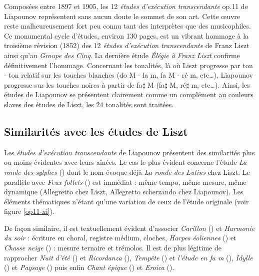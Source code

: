Composées entre 1897 et 1905, les 12 \emph{études d'exécution transcendante} op.11 de Liapounov représentent sans aucun doute le sommet de son art. Cette œuvre reste malheureusement fort peu connu tant des interprètes que des musicophiles. Ce monumental cycle d'études, environ 130 pages, est un vibrant hommage à la troisième révision (1852) des 12 \emph{études d'exécution transcendante} de Franz Liszt ainsi qu'au \emph{Groupe des Cinq}. La dernière étude \emph{Élégie à Franz Liszt} confirme définitivement l'hommage. Concernant les tonalités, là où Liszt progresse par ton - ton relatif sur les touches blanches (do M - la m, fa M - ré m, etc\dots), Liapounov progresse sur les touches noires à partir de fa$\sharp$ M (fa$\sharp$ M, ré$\sharp$ m, etc\dots). Ainsi, les études de Liapounov se présentent clairement comme un complément au couleurs slaves des études de Liszt, les 24 tonalités sont traitées.

\subsection{Similarités avec les études de Liszt}

Les \emph{études d'exécution transcendante} de Liapounov présentent des similarités plus ou moins évidentes avec leurs aînées. Le cas le plus évident concerne l'étude \emph{La ronde des sylphes} () dont le nom évoque déjà \emph{La ronde des Lutins} chez Liszt. Le parallèle avec \emph{Feux follets} () est immédiat : même tempo, même mesure, même dynamique (Allegretto chez Liszt, Allegretto scherzando chez Liapounov). Les éléments thématiques n'étant qu'une variation de ceux de l'étude originale (voir figure \ref{op11-xi}).

De façon similaire, il est textuellement évident d'associer \emph{Carillon} () et \emph{Harmonie du soir} : écriture en choral, registre médium, cloches, \emph{Harpes éoliennes} () et \emph{Chasse neige} () : mesure ternaire et trémolos. Il est de plus légitime de rapprocher \emph{Nuit d'été} () et \emph{Ricordanza} (), \emph{Tempête} () et \emph{l'étude en fa m} (), \emph{Idylle} () et \emph{Paysage} () puis enfin \emph{Chant épique} () et \emph{Eroica} ().

